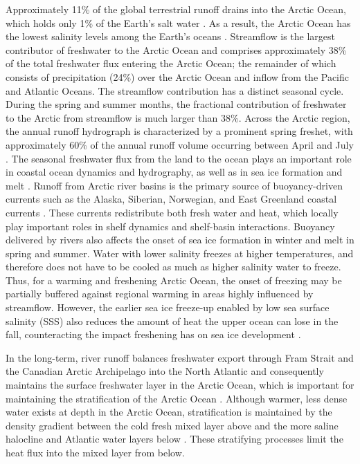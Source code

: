 \documentclass[jgrga, draft]{agutex}
\begin{document}
\begin{article}
Approximately 11\% of the global terrestrial runoff drains into the Arctic Ocean, which holds only 1\% of the Earth's salt water \citep{Lewis_2000,Lammers_2001}.
As a result, the Arctic Ocean has the lowest salinity levels among the Earth's oceans \citep{Steele_2001}.
Streamflow is the largest contributor of freshwater to the Arctic Ocean and comprises approximately 38\% of the total freshwater flux entering the Arctic Ocean; the remainder of which consists of precipitation (24\%) over the Arctic Ocean \citep{Serreze_2006} and inflow from the Pacific and Atlantic Oceans.
The streamflow contribution has a distinct seasonal cycle.
During the spring and summer months, the fractional contribution of freshwater to the Arctic from streamflow is much larger than 38\%.
Across the Arctic region, the annual runoff hydrograph is characterized by a prominent spring freshet, with approximately 60\% of the annual runoff volume occurring between April and July \citep{Lammers_2001}.
The seasonal freshwater flux from the land to the ocean plays an important role in coastal ocean dynamics and hydrography, as well as in sea ice formation and melt \citep{Rabe_2011,Fichot_2013}.
Runoff from Arctic river basins is the primary source of buoyancy-driven currents such as the Alaska, Siberian, Norwegian, and East Greenland coastal currents \citep[e.g.][]{Morison_2000,Boyd_2002,McGeehan_2012}.
These currents redistribute both fresh water and heat, which locally play important roles in shelf dynamics and shelf-basin interactions.
Buoyancy delivered by rivers also affects the onset of sea ice formation in winter and melt in spring and summer.
Water with lower salinity freezes at higher temperatures, and therefore does not have to be cooled as much as higher salinity water to freeze.
Thus, for a warming and freshening Arctic Ocean, the onset of freezing may be partially buffered against regional warming in areas highly influenced by streamflow.
However, the earlier sea ice freeze-up enabled by low sea surface salinity (SSS) also reduces the amount of heat the upper ocean can lose in the fall, counteracting the impact freshening has on sea ice development \citep{Morison_2012}.

In the long-term, river runoff balances freshwater export through Fram Strait and the Canadian Arctic Archipelago into the North Atlantic and consequently maintains the surface freshwater layer in the Arctic Ocean, which is important for maintaining the stratification of the Arctic Ocean \citep{Nummelin_2015}. %
Although warmer, less dense water exists at depth in the Arctic Ocean, stratification is maintained by the density gradient between the cold fresh mixed layer above and the more saline halocline and Atlantic water layers below \citep{Serreze_2006}.
These stratifying processes limit the heat flux into the mixed layer from below.


\end{article}
\end{document}
